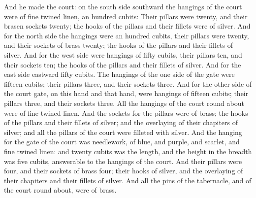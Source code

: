  And he made the court: on the south side southward the
hangings of the court were of fine twined linen, an hundred cubits:
 Their pillars were twenty, and their brasen sockets
twenty; the hooks of the pillars and their fillets were of silver.
 And for the north side the hangings were an hundred
cubits, their pillars were twenty, and their sockets of brass twenty;
the hooks of the pillars and their fillets of silver. 
And for the west side were hangings of fifty cubits, their pillars ten,
and their sockets ten; the hooks of the pillars and their fillets of
silver.  And for the east side eastward fifty cubits.
 The hangings of the one side of the gate were fifteen
cubits; their pillars three, and their sockets three. 
And for the other side of the court gate, on this hand and that hand,
were hangings of fifteen cubits; their pillars three, and their sockets
three.  All the hangings of the court round about were of
fine twined linen.  And the sockets for the pillars were
of brass; the hooks of the pillars and their fillets of silver; and the
overlaying of their chapiters of silver; and all the pillars of the
court were filleted with silver.  And the hanging for the
gate of the court was needlework, of blue, and purple, and scarlet, and
fine twined linen: and twenty cubits was the length, and the height in
the breadth was five cubits, answerable to the hangings of the court.
 And their pillars were four, and their sockets of brass
four; their hooks of silver, and the overlaying of their chapiters and
their fillets of silver.  And all the pins of the
tabernacle, and of the court round about, were of brass.

